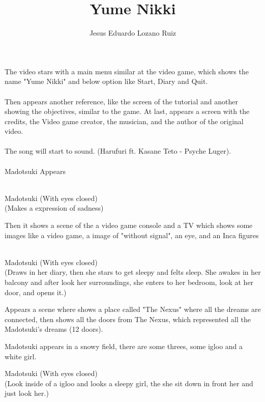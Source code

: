 \documentclass{screenplay}
\author{Jesus Eduardo Lozano Ruiz}
\title{Yume Nikki}
\begin{document}
	\coverpage
	
	The video stars with a main menu similar at the video game, which shows the name "Yume Nikki" and below option like Start, Diary and Quit.\\~\\
	Then appears another reference, like the screen of the tutorial and another showing the objectives, similar to the game. At last, appears a screen with the credits, the Video game creator, the musician, and the author of the original video.\\~\\
	The song will start to sound. (Harufuri ft. Kasane Teto - Psyche Luger).\\~\\
	Madotsuki Appears\\~\\
	
	\begin{dialogue}{Madotsuki}
		(With eyes closed)\\
		(Makes a expression of sadness)
	\end{dialogue}
	
	Then it shows a scene of the a video game console and a TV which shows some images like a video game, a image of "without signal", an eye, and an Inca figures\\~\\

	\begin{dialogue}{Madotsuki}
		(With eyes closed)\\
		(Draws in her diary, then she stars to get sleepy and felts sleep. She awakes in her balcony and after look her surroundings, she enters to her bedroom, look at her door, and opens it.)
	\end{dialogue}
	
	Appears a scene where shows a place called "The Nexus" where all the dreams are connected, then shows all the doors from The Nexus, which represented all the Madotsuki's dreams (12 doors).
	
	Madotsuki appears in a snowy field, there are some threes, some igloo and a white girl. 
	
	\begin{dialogue}{Madotsuki}
		(With eyes closed)\\
		(Look inside of a igloo and looks a sleepy girl, the she sit down in front her and just look her.)
	\end{dialogue}
	
\end{document}
